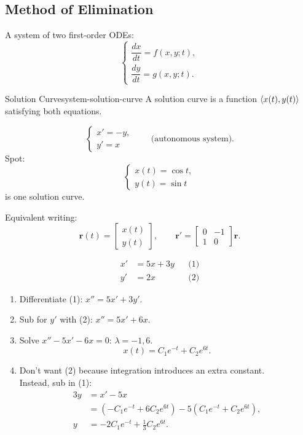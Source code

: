 \subsection{Method of Elimination}

A system of two first-order ODEs:
\[
  \begin{cases}
    \dfrac{dx}{dt}=f(x,y;t), \\[0.5em]
    \dfrac{dy}{dt}=g(x,y;t).
  \end{cases}
\]
\begin{definition}{Solution Curve}{system-solution-curve}
  A solution curve is a function $\langle x(t),y(t) \rangle$ satisfying both equations.
\end{definition}

\begin{example}
  \[
    \begin{cases}
      x'=-y, \\
      y'=x
    \end{cases}
    \qquad\text{(autonomous system).}
  \]
  Spot:
  \[
    \begin{cases}
      x(t)=\cos t, \\
      y(t)=\sin t
    \end{cases}
  \]
  is one solution curve.

  Equivalent writing:
  \[
    \mathbf{r}(t)=
    \begin{bmatrix}
      x(t) \\y(t)
    \end{bmatrix}
    ,
    \qquad\mathbf{r}'=
    \begin{bmatrix}
      0 & -1 \\1&0
    \end{bmatrix}
    \mathbf{r}.
  \]
\end{example}

\begin{example}
  \[
    \begin{aligned}
      x' & =5x+3y &  & \text{(1)} \\
      y' & =2x    &  & \text{(2)}
    \end{aligned}
  \]
  \begin{enumerate}
    \item Differentiate (1): $x''=5x'+3y'$.
    \item Sub for $y'$ with (2): $x''=5x'+6x$.
    \item Solve $x''-5x'-6x=0$: $\lambda=-1,6$.
          \[
            x(t)=C_1e^{-t}+C_2e^{6t}.
          \]
    \item Don't want (2) because integration introduces an extra constant.\\
          Instead, sub in (1):
          \begin{align*}
            3y & =x'-5x                                           \\
               & =(-C_1e^{-t}+6C_2e^{6t})-5(C_1e^{-t}+C_2e^{6t}), \\
            y  & =-2C_1e^{-t}+\frac13C_2e^{6t}.
          \end{align*}
  \end{enumerate}
\end{example}

